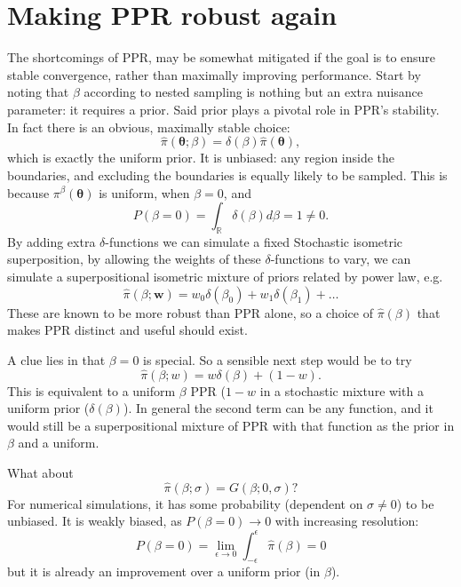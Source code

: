 \documentclass[usenatbib]{mnras}
\begin{document}
\section{Making PPR robust again}
The shortcomings of PPR, may be somewhat mitigated if the goal is to
ensure stable convergence, rather than maximally improving
performance. Start by noting that $\beta$ according to nested sampling
is nothing but an extra nuisance parameter: it requires a prior. Said
prior plays a pivotal role in PPR's stability. In fact there is an
obvious, maximally stable choice:
\begin{equation}
  \label{}
\hat{\pi}(\bm{\theta}; \beta) = \delta(\beta) \hat{\pi}(\bm{\theta}), 
\end{equation}
which is exactly the uniform prior. It is unbiased: any region inside
the boundaries, and excluding the boundaries is equally likely to be
sampled. This is because $\pi^{\beta}(\bm{\theta})$ is uniform, when $\beta=0$, and
\begin{equation}\label{eq:PPR-uniform}
P(\beta=0) = \int_{\mathbb{R}} \delta(\beta) d\beta = 1 \ne 0. 
\end{equation}
By adding extra $\delta$-functions we can simulate a fixed Stochastic
isometric superposition, by allowing the weights of these
$\delta$-functions to vary, we can simulate a superpositional
isometric mixture of priors related by power law, e.g.
\begin{equation}
  \label{}
  \hat{\pi}(\beta; \bm{w}) = w_{0}\delta(\beta_{0}) + w_{1}\delta(\beta_{1})+\ldots
\end{equation}
These are known to be more robust than PPR alone, so a choice of
$\hat{\pi}(\beta)$ that makes PPR distinct and useful should exist.

A clue lies in that $\beta=0$ is special. So a sensible next step
would be to try
\begin{equation}
  \label{}
\hat{\pi}(\beta; w) = w \delta(\beta) + (1-w). 
\end{equation}
This is equivalent to a uniform $\beta$ PPR (\(1-w\) in a stochastic
mixture with a uniform prior ($\delta(\beta)$). In general the second
term can be any function, and it would still be a superpositional
mixture of PPR with that function as the prior in $\beta$ and a
uniform.

What about
\begin{equation}
\hat{\pi}(\beta; \sigma) = G(\beta; 0, \sigma)?
\end{equation}
For numerical simulations, it has some probability (dependent on
$\sigma \ne 0$) to be unbiased. It is weakly biased, as
\(P(\beta=0) \rightarrow 0\) with increasing resolution:
\begin{equation}
  \label{eq:p0}
   P(\beta=0) = \lim_{\epsilon\rightarrow 0} \int_{-\epsilon}^{\epsilon}\hat{\pi}(\beta) = 0
\end{equation}
but it is already an improvement over a uniform prior (in $\beta$).
\end{document}
